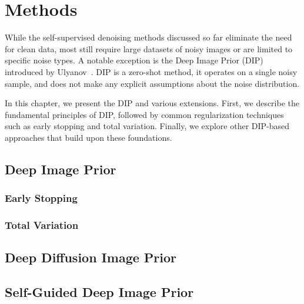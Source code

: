 \chapter{Methods}\label{ch:methods}

While the self-supervised denoising methods discussed so far eliminate the need for clean data, most still require large datasets of noisy images or are limited to specific noise types.
A notable exception is the Deep Image Prior (DIP) introduced by Ulyanov~\etalc \cite{DIP}.
DIP is a zero-shot method, \ie it operates on a single noisy sample, and does not make any explicit assumptions about the noise distribution.

In this chapter, we present the DIP and various extensions.
First, we describe the fundamental principles of DIP, followed by common regularization techniques such as early stopping and total variation.
Finally, we explore other DIP-based approaches that build upon these foundations.

\section{Deep Image Prior}

\subsection{Early Stopping}

\subsection{Total Variation}

\section{Deep Diffusion Image Prior}

\section{Self-Guided Deep Image Prior}
